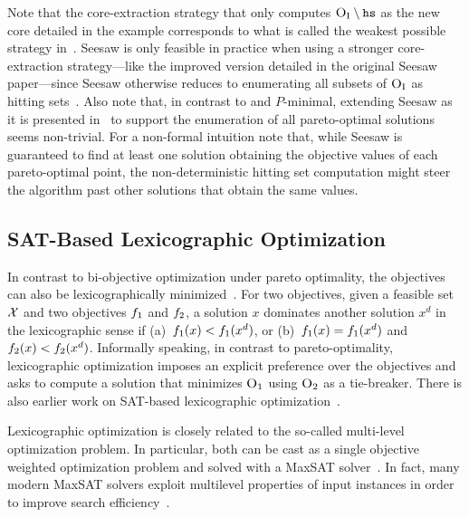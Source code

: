 Note that the core-extraction strategy that only computes $\textsc{O}_{\text{I}} \setminus \texttt{hs}$ as the new core detailed in the example corresponds to what is called the weakest possible strategy in~\textcite{DBLP:conf/cp/JanotaMSM21}.
Seesaw is only feasible in practice when using a stronger core-extraction strategy---like the improved version detailed in the original Seesaw paper---since Seesaw otherwise reduces to enumerating all subsets of $\textsc{O}_{\text{I}}$ as hitting sets~\autocite{DBLP:conf/cp/JanotaMSM21}.
Also note that, in contrast to \algname{} and $P$-minimal, extending Seesaw as it is presented in~\textcite{DBLP:conf/cp/JanotaMSM21} to support the enumeration of all pareto-optimal solutions seems non-trivial.
For a non-formal intuition note that, while Seesaw is guaranteed to find at least one solution obtaining the objective values of each pareto-optimal point, the non-deterministic hitting set computation might steer the algorithm past other solutions that obtain the same values.

\subsection{SAT-Based Lexicographic Optimization\label{sec:lex-opt}}

In contrast to bi-objective optimization under pareto optimality, the objectives can also be lexicographically minimized~\autocite{Ehrgott2005-1}.
For two objectives, given a feasible set $\mathcal{X}$ and two objectives $f_1$ and $f_2$, a solution $x$ dominates another solution $x^d$ in the lexicographic sense if (a)~$f_1(x) < f_1(x^d)$, or (b)~$f_1(x) = f_1(x^d)$ and $f_2(x) < f_2(x^d)$.
Informally speaking, in contrast to pareto-optimality, lexicographic optimization imposes an explicit preference over the objectives and asks to compute a solution that minimizes $\textsc{O}_1$ using $\textsc{O}_2$ as a tie-breaker.
There is also earlier work on SAT-based lexicographic optimization~\autocite{DBLP:journals/ors/EhrgottG00,DBLP:conf/ijcai/ArgelichLS09,DBLP:journals/amai/Marques-SilvaAGL11}. 

Lexicographic optimization is closely related to the so-called multi-level optimization problem.
In particular, both can be cast as a single objective weighted optimization problem and solved with a MaxSAT solver~\autocite{DBLP:conf/ijcai/ArgelichLS09,DBLP:journals/amai/Marques-SilvaAGL11}.
In fact, many modern MaxSAT solvers exploit  multilevel properties of input instances in order to improve search efficiency~\autocite{DBLP:conf/vmcai/PaxianRB21,DBLP:conf/cp/AnsoteguiBGL12}.

